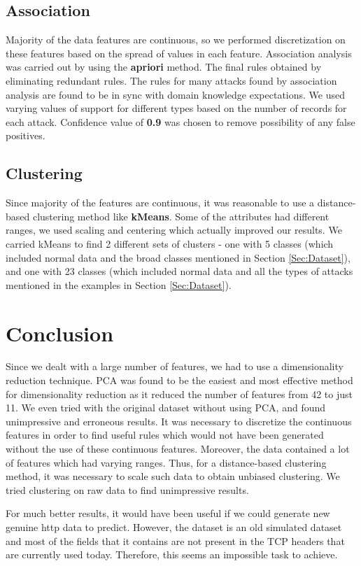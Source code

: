 \documentclass[11pt]{article}
\begin{document}
\subsection{Association}
Majority of the data features are continuous, so we performed discretization on these features based on the spread of values in each feature. Association analysis was carried out by using the \textbf{apriori} method. The final rules obtained by eliminating redundant rules. The rules for many attacks found by association analysis are found to be in sync with domain knowledge expectations. We used varying values of support for different types based on the number of records for each attack. Confidence value of {\bf 0.9} was chosen to remove possibility of any false positives.

\subsection{Clustering}
Since majority of the features are continuous, it was reasonable to use a distance-based clustering method like \textbf{kMeans}. Some of the attributes had different ranges, we used scaling and centering which actually improved our results. We carried kMeans to find 2 different sets of clusters - one with 5 classes (which included normal data and the broad classes mentioned in Section \ref{Sec:Dataset}), and one with 23 classes (which included normal data and all the types of attacks mentioned in the examples in Section \ref{Sec:Dataset}).

\section{Conclusion}
\label{Sec:Concl}

Since we dealt with a large number of features, we had to use a dimensionality reduction technique. PCA was found to be the easiest and most effective method for dimensionality reduction as it reduced the number of features from 42 to just 11. We even tried with the original dataset without using PCA, and found unimpressive and erroneous results. It was necessary to discretize the continuous features in order to find useful rules which would not have been generated without the use of these continuous features. Moreover, the data contained a lot of features which had varying ranges. Thus, for a distance-based clustering method, it was necessary to scale such data to obtain unbiased clustering. We tried clustering on raw data to find unimpressive results.

For much better results, it would have been useful if we could generate new genuine http data to predict. However, the dataset is an old simulated dataset and most of the fields that it contains are not present in the TCP headers that are currently used today. Therefore, this seems an impossible task to achieve.



\end{document}
